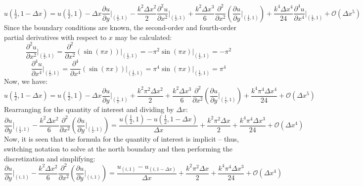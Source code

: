 \documentclass[10pt]{article}		%
\numberwithin{equation}{section}
\newcommand{\pder}[2]{\frac{\partial#1}{\partial#2}}			%
\newcommand{\psder}[2]{\dfrac{\partial^2#1}{\partial#2^2}}		%
\newcommand{\pfder}[2]{\dfrac{\partial^4#1}{\partial#2^4}}		%
\begin{document}
\begin{equation}
u(\tfrac{1}{2}, 1-\Delta x) = u(\tfrac{1}{2}, 1) - \Delta x \pder{u}{y}\Big|_{\left(\tfrac{1}{2}, 1\right)} - \frac{k^2 \Delta x^2}{2} \psder{u}{x}\Big|_{\left(\tfrac{1}{2}, 1\right)} + \frac{k^2 \Delta x^3}{6} \psder{}{x}\left(\pder{u}{y}\Big|_{\left(\tfrac{1}{2}, 1\right)}\right) + \frac{k^4 \Delta x^4}{24} \pfder{u}{x}\Big|_{\left(\tfrac{1}{2}, 1\right)} + \mathcal{O}(\Delta x^5)
\end{equation}
Since the boundary conditions are known, the second-order and fourth-order partial derivatives with respect to $x$ may be calculated:
\begin{equation}
\psder{u}{x}\Big|_{\left(\tfrac{1}{2}, 1\right)}=\psder{}{x}\left(\sin(\pi x)\right)\Big|_{\left(\tfrac{1}{2}, 1\right)}=-\pi^2\sin(\pi x)\Big|_{\left(\tfrac{1}{2}, 1\right)} = -\pi^2
\end{equation}
\begin{equation}
\pfder{u}{x}\Big|_{\left(\tfrac{1}{2}, 1\right)}=\pfder{}{x}\left(\sin(\pi x)\right)\Big|_{\left(\tfrac{1}{2}, 1\right)}=\pi^4\sin(\pi x)\Big|_{\left(\tfrac{1}{2}, 1\right)} = \pi^4
\end{equation}
Now, we have:
\begin{equation}
u(\tfrac{1}{2}, 1-\Delta x) = u(\tfrac{1}{2}, 1) - \Delta x \pder{u}{y}\Big|_{\left(\tfrac{1}{2}, 1\right)} + \frac{k^2 \pi^2 \Delta x^2}{2} + \frac{k^2 \Delta x^3}{6} \psder{}{x}\left(\pder{u}{y}\Big|_{\left(\tfrac{1}{2}, 1\right)}\right) + \frac{k^4 \pi^4 \Delta x^4}{24} + \mathcal{O}(\Delta x^5)
\end{equation}
Rearranging for the quantity of interest and dividing by $\Delta x$:
\begin{equation}
\pder{u}{y}\Big|_{\left(\tfrac{1}{2}, 1\right)} - \frac{k^2 \Delta x^2}{6} \psder{}{x}\left(\pder{u}{y}\Big|_{\left(\tfrac{1}{2}, 1\right)}\right) = \frac{u(\tfrac{1}{2}, 1) - u(\tfrac{1}{2}, 1-\Delta x)}{\Delta x}  + \frac{k^2 \pi^2 \Delta x}{2} + \frac{k^4 \pi^4 \Delta x^3}{24} + \mathcal{O}(\Delta x^4)
\end{equation}
Now, it is seen that the formula for the quantity of interest is implicit -- thus, switching notation to solve at the north boundary and then performing the discretization and simplifying:
\begin{equation}
\pder{u}{y}\Big|_{(i, 1)} - \frac{k^2 \Delta x^2}{6} \psder{}{x}\left(\pder{u}{y}\Big|_{(i, 1)}\right) = \frac{u_{(i, 1)} - u_{(i, 1-\Delta x)}}{\Delta x}  + \frac{k^2 \pi^2 \Delta x}{2} + \frac{k^4 \pi^4 \Delta x^3}{24} + \mathcal{O}(\Delta x^4)
\end{equation}
\end{document}
